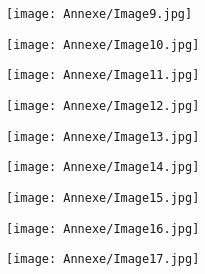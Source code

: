     \begin{figure}[H]
   \centering
   \texttt{[image: Annexe/Image9.jpg]}
	\caption{\cite{entretienmasson}}\label{fig:masson}
    \end{figure}


    \begin{figure}[H]
   \centering
   \texttt{[image: Annexe/Image10.jpg]}
	\caption{\cite{specialelsa}}\label{fig:napoleon}
    \end{figure}


    \begin{figure}[H]
   \centering
   \texttt{[image: Annexe/Image11.jpg]}
	\caption{\cite{plafondodeon}}\label{fig:odeon}
    \end{figure}


    \begin{figure}[H]
   \centering
   \texttt{[image: Annexe/Image12.jpg]}
	\caption{\cite{specialelsa}}\label{fig:elsa2}
    \end{figure}


    \begin{figure}[H]
   \centering
   \texttt{[image: Annexe/Image13.jpg]}
	\caption{\cite{specialelsa}}\label{fig:elsa3}
    \end{figure}


    \begin{figure}[H]
   \centering
   \texttt{[image: Annexe/Image14.jpg]}
	\caption{\cite{specialelsa}}\label{fig:elsa4}
    \end{figure}


    \begin{figure}[H]
   \centering
   \texttt{[image: Annexe/Image15.jpg]}
	\caption{\cite{courbetcommunard}}\label{fig:courbetcommune}
    \end{figure}


    \begin{figure}[H]
   \centering
   \texttt{[image: Annexe/Image16.jpg]}
	\caption{\cite{specialelsa}}\label{fig:elsa5}
    \end{figure}


    \begin{figure}[H]
   \centering
   \texttt{[image: Annexe/Image17.jpg]}
	\caption{\cite{durand}}\label{fig:nuitcommejour}
    \end{figure}


